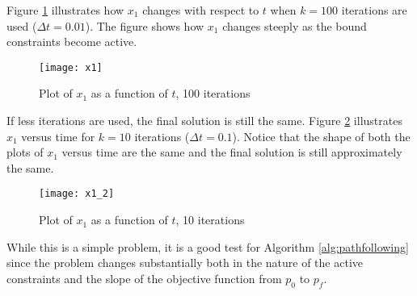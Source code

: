\begin{exmp}
\par
Figure \ref{fig:x1} illustrates how $x_1$ changes with respect to $t$ when $k=100$ iterations are used ($\Delta t = 0.01$).
The figure shows how $x_1$ changes steeply as the bound constraints become active.
\begin{figure}[H]
	\centering
	\texttt{[image: x1]}
	\caption{Plot of $x_1$ as a function of $t$, 100 iterations}
   \label{fig:x1}
\end{figure}
If less iterations are used, the final solution is still the same.
Figure \ref{fig:x1_2} illustrates $x_1$ versus time for $k=10$ iterations ($\Delta t=0.1$).
Notice that the shape of both the plots of $x_1$ versus time are the same and the final solution is still approximately the same.
\begin{figure}[H]
	\centering
	\texttt{[image: x1\_2]}
	\caption{Plot of $x_1$ as a function of $t$, 10 iterations}
   \label{fig:x1_2}
\end{figure}
\par
While this is a simple problem, it is a good test for Algorithm \ref{alg:pathfollowing} since the problem changes substantially both in the nature of the active constraints and the slope of the objective function from $p_0$ to $p_f$\cite{param}.
\end{exmp}